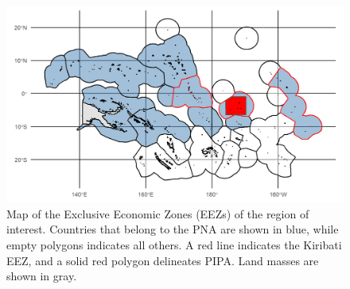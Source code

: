 \documentclass[9p,twocolumn,twoside,lineno]{pnas-new}
\begin{document}
\begin{figure}
\centering
\includegraphics{img/PNA_map.png}
\caption{\label{fig:PNA_map}Map of the Exclusive Economic Zones (EEZs) of the region of interest. Countries that belong to the PNA are shown in blue, while empty polygons indicates all others. A red line indicates the Kiribati EEZ, and a solid red polygon delineates PIPA. Land masses are shown in gray.}
\end{figure}
\end{document}
